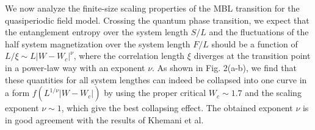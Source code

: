 \documentclass[prl,aps,epsf,showpacs,twocolumn,letterpaper]{revtex4}
\begin{document}
We now analyze the finite-size  scaling properties of the MBL transition for  the quasiperiodic field model.
Crossing  the quantum phase transition,  we expect that the  entanglement entropy over the system length  $S/L$ and the fluctuations of the
half system magnetization over the system length  $F/L$   should  be a function of
$L/\xi\sim  L|W-W_c|^{\nu}$, where the correlation length $\xi$ diverges   at the transition point in a power-law way with an  exponent $\nu$.
As shown in Fig. 2(a-b),  we find that these quantities for all system lengthes can indeed be collapsed into one curve
in a form $f(L^{1/\nu}|W-W_c|)$ by using  the proper critical $W_c\sim 1.7$ and the scaling exponent $\nu\sim 1$, which give the best collapsing effect.
The obtained exponent $\nu$ is in good agreement with the results of 
 Khemani  et al.\cite{vedika2017}



\end{document}
